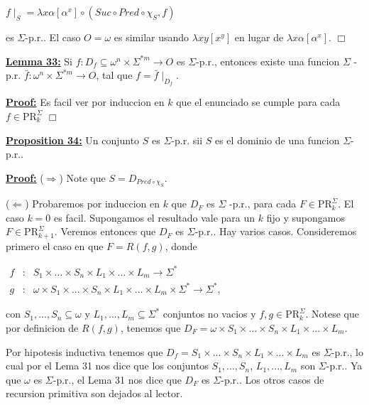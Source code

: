   \(\displaystyle f\mid _{S}=\lambda x\alpha \left[ \alpha ^{x}\right] \circ \left( Suc\circ Pred\circ \chi _{S},f\right) \)

  es \(\Sigma \)-p.r.. El caso \(O=\omega \) es similar usando \(\lambda xy\left[ x^{y}\right] \) en lugar de \(\lambda x\alpha \left[ \alpha ^{x}\right] \). \(\Box\)


  \textbf{\underline{Lemma 33:}} Si \(f:D_{f}\subseteq \omega ^{n}\times \Sigma ^{\ast m}\rightarrow O\) es \(\Sigma \)-p.r., entonces existe una funcion \(\Sigma \) -p.r. \(\bar{f}:\omega ^{n}\times \Sigma ^{\ast m}\rightarrow O\), tal que \(f= \bar{f}\mid _{D_{f}}\).

  \textbf{\underline{Proof:}} Es facil ver por induccion en \(k\) que el enunciado se cumple para cada \(f\in \mathrm{PR}_{k}^{\Sigma }\) \(\Box\)


  \textbf{\underline{Proposition 34:}} Un conjunto \(S\) es \(\Sigma \)-p.r. sii \(S\) es el dominio de una funcion \(\Sigma \)-p.r.\(.\)

  \textbf{\underline{Proof:}} (\(\Rightarrow \)) Note que \(S=D_{Pred\circ \chi _{S}}.\)

  (\(\Leftarrow \)) Probaremos por induccion en \(k\) que \(D_{F}\) es \(\Sigma \) -p.r., para cada \(F\in \mathrm{PR}_{k}^{\Sigma }.\) El caso \(k=0\) es facil\(.\) Supongamos el resultado vale para un \(k\) fijo y supongamos \(F\in \mathrm{PR} _{k+1}^{\Sigma }.\) Veremos entonces que \(D_{F}\) es \(\Sigma \)-p.r.. Hay varios casos. Consideremos primero el caso en que \(F=R(f,g)\), donde

  \(\displaystyle \begin{array}{rcl} f & :& S_{1}\times ...\times S_{n}\times L_{1}\times ...\times L_{m}\rightarrow \Sigma ^{\ast } \\ g & :& \omega \times S_{1}\times ...\times S_{n}\times L_{1}\times ...\times L_{m}\times \Sigma ^{\ast }\rightarrow \Sigma ^{\ast }, \end{array} \)

  con \(S_{1},...,S_{n}\subseteq \omega \) y \(L_{1},...,L_{m}\subseteq \Sigma ^{\ast }\) conjuntos no vacios y \(f,g\in \mathrm{PR}_{k}^{\Sigma }\). Notese que por definicion de \(R(f,g)\), tenemos que
  \(\displaystyle D_{F}=\omega \times S_{1}\times ...\times S_{n}\times L_{1}\times ...\times L_{m}. \)

  Por hipotesis inductiva tenemos que \(D_{f}=S_{1}\times ...\times S_{n}\times L_{1}\times ...\times L_{m}\) es \(\Sigma \)-p.r., lo cual por el Lema 31 nos dice que los conjuntos \(S_{1},...,S_{n}\), \( L_{1},...,L_{m}\) son \(\Sigma \)-p.r.. Ya que \(\omega \) es \(\Sigma \)-p.r., el Lema 31 nos dice que \(D_{F}\) es \(\Sigma \)-p.r..
  Los otros casos de recursion primitiva son dejados al lector.

